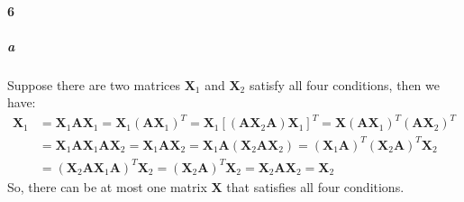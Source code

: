 \documentclass[22pt]{article}
\begin{document}
	\paragraph{6}
		\subparagraph{a} Suppose there are two matrices $\mathbf{X}_1$ and $\mathbf{X}_2$ satisfy all four conditions, then we have:
		\begin{align}
			\mathbf{X}_1 & = \mathbf{X}_1\mathbf{AX}_1 = \mathbf{X}_1(\mathbf{AX}_1)^T = \mathbf{X}_1[(\mathbf{AX}_2\mathbf{A})\mathbf{X}_1]^T = \mathbf{X}(\mathbf{AX}_1)^T(\mathbf{AX}_2)^T\\& = \mathbf{X}_1\mathbf{AX}_1\mathbf{AX}_2 = \mathbf{X}_1\mathbf{AX}_2 = \mathbf{X}_1\mathbf{A}(\mathbf{X}_2\mathbf{A}\mathbf{X}_2) = (\mathbf{X}_1\mathbf{A})^T(\mathbf{X}_2\mathbf{A})^T\mathbf{X}_2\\ & = (\mathbf{X}_2\mathbf{AX}_1\mathbf{A})^T\mathbf{X}_2 = (\mathbf{X}_2\mathbf{A})^T\mathbf{X}_2 = \mathbf{X}_2\mathbf{AX}_2 = \mathbf{X}_2
		\end{align}
		So, there can be at most one matrix $\mathbf{X}$ that satisfies all four conditions.
\end{document}
